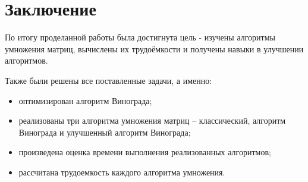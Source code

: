 \chapter*{Заключение}
По итогу проделанной работы была достигнута цель - изучены алгоритмы умножения матриц, вычислены их трудоёмкости и получены навыки в улучшении алгоритмов.

Также были решены все поставленные задачи, а именно:

\begin{itemize}
	\item оптимизирован алгоритм Винограда; 
	\item реализованы три алгоритма умножения матриц -- классический, алгоритм Винограда и улучшенный алгоритм Винограда; 
	\item произведена оценка времени выполнения реализованных алгоритмов;
	\item рассчитана трудоемкость каждого алгоритма умножения.
\end{itemize}